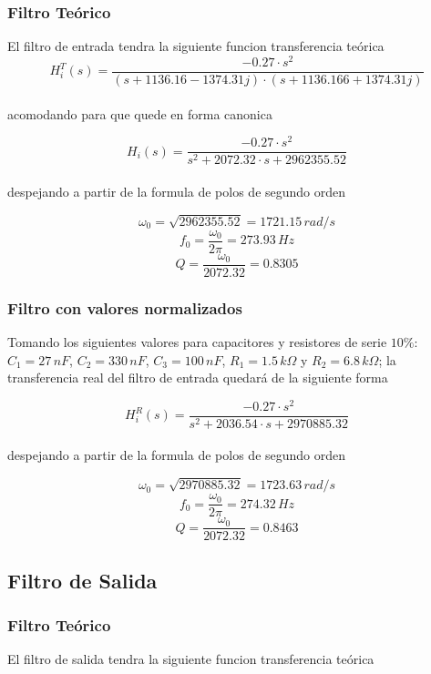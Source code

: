 \subsubsection{Filtro Teórico}

El filtro de entrada tendra la siguiente funcion transferencia teórica \\

$$H_{i}^{T}(s)=\frac{-0.27 \cdot s^{2}}{(s + 1136.16 - 1374.31j) \cdot (s + 1136.166 + 1374.31j)}$$ \\

acomodando para que quede en forma canonica

$$H_i(s)=\frac{-0.27 \cdot s^{2}}{s^{2}+2072.32 \cdot s + 2962355.52}$$ \\

despejando a partir de la formula de polos de segundo orden

$$\omega_{0}= \sqrt{2962355.52} = 1721.15 \, rad/s $$
$$f_{0}= \frac{\omega_{0}}{2\pi} = 273.93 \, Hz $$
$$ Q= \frac{\omega_0}{2072.32} = 0.8305 $$

\subsubsection{Filtro con valores normalizados}

Tomando los siguientes valores para capacitores y resistores de serie $10\%$:
$C_{1} = 27 \, nF$, $C_{2} = 330 \, nF$, $C_{3} = 100 \, nF$, $R_{1} = 1.5 \, k\Omega$ y $R_{2} = 6.8 \, k\Omega$; la transferencia real del filtro de entrada quedará de la siguiente forma

$$H_{i}^{R}(s)=\frac{-0.27 \cdot s^{2}}{s^{2}+2036.54 \cdot s + 2970885.32}$$ \\

despejando a partir de la formula de polos de segundo orden

$$\omega_{0}= \sqrt{2970885.32} = 1723.63 \, rad/s $$
$$f_{0}= \frac{\omega_{0}}{2\pi} = 274.32 \, Hz $$
$$ Q= \frac{\omega_0}{2072.32} = 0.8463 $$

\subsection{Filtro de Salida}

\subsubsection{Filtro Teórico}
El filtro de salida tendra la siguiente funcion transferencia teórica \\

